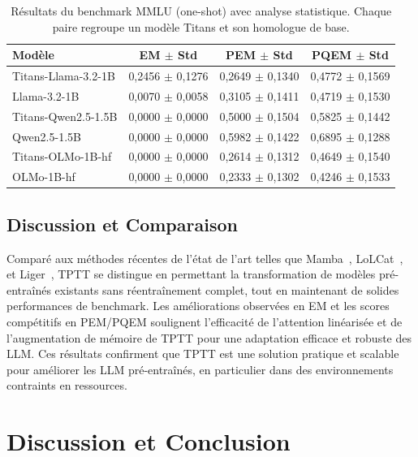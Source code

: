 \documentclass[10pt,a4paper]{article}
\begin{document}
\begin{table}[h!]
    \centering
    \renewcommand{\arraystretch}{1.2}
    \begin{tabular}{|l|c|c|c|}
    \hline
    Modèle & EM $\pm$ Std & PEM $\pm$ Std & PQEM $\pm$ Std \\
    \hline
    Titans-Llama-3.2-1B & 0,2456 $\pm$ 0,1276 & 0,2649 $\pm$ 0,1340 & 0,4772 $\pm$ 0,1569 \\
    Llama-3.2-1B & 0,0070 $\pm$ 0,0058 & 0,3105 $\pm$ 0,1411 & 0,4719 $\pm$ 0,1530 \\
    \hline
    Titans-Qwen2.5-1.5B & 0,0000 $\pm$ 0,0000 & 0,5000 $\pm$ 0,1504 & 0,5825 $\pm$ 0,1442 \\
    Qwen2.5-1.5B & 0,0000 $\pm$ 0,0000 & 0,5982 $\pm$ 0,1422 & 0,6895 $\pm$ 0,1288 \\
    \hline
    Titans-OLMo-1B-hf & 0,0000 $\pm$ 0,0000 & 0,2614 $\pm$ 0,1312 & 0,4649 $\pm$ 0,1540 \\
    OLMo-1B-hf & 0,0000 $\pm$ 0,0000 & 0,2333 $\pm$ 0,1302 & 0,4246 $\pm$ 0,1533 \\
    \hline
    \end{tabular}
    \caption{Résultats du benchmark MMLU (one-shot) avec analyse statistique. Chaque paire regroupe un modèle Titans et son homologue de base.}
    \label{tab:mmlu-results}
\end{table}

\subsection{Discussion et Comparaison}

Comparé aux méthodes récentes de l'état de l'art telles que Mamba~\cite{gu2023mamba}, LoLCat~\cite{zhang2024lolcats}, et Liger~\cite{lan2025liger}, TPTT se distingue en permettant la transformation de modèles pré-entraînés existants sans réentraînement complet, tout en maintenant de solides performances de benchmark. Les améliorations observées en EM et les scores compétitifs en PEM/PQEM soulignent l'efficacité de l'attention linéarisée et de l'augmentation de mémoire de TPTT pour une adaptation efficace et robuste des LLM. Ces résultats confirment que TPTT est une solution pratique et scalable pour améliorer les LLM pré-entraînés, en particulier dans des environnements contraints en ressources.

\section{Discussion et Conclusion}
\end{document}
